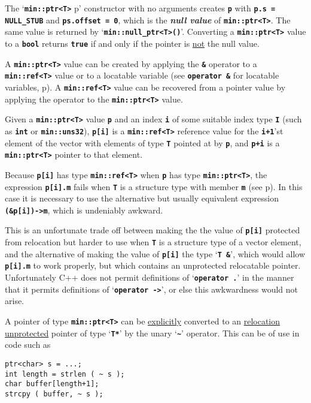 \documentclass[12pt]{article}
\newcommand{\TT}[1]{{\tt \bfseries #1}}
\newcommand{\mkey}[2]{{\bf \em #1}\index{#1!#2}}
\newcommand{\pagref}[1]{p\pageref{#1}}
\newcommand{\EOL}{\penalty \exhyphenpenalty}
\newenvironment{indpar}[1][0.3in]%
	{\begin{list}{}%
		     {\setlength{\itemsep}{0in}%
		      \setlength{\topsep}{0in}%
		      \setlength{\parsep}{1ex}%
		      \setlength{\labelwidth}{#1}%
		      \setlength{\leftmargin}{#1}%
		      \addtolength{\leftmargin}{\labelsep}}%
	 \item}%
	{\end{list}}
\begin{document}
The `\TT{min::\EOL ptr<T>} p' constructor with no arguments creates \TT{p}
with \TT{p.s = NULL\_STUB} and \TT{ps.offset = 0}, which is the
\mkey{null value}{of {\tt ptr<T>}} of \TT{min::\EOL ptr<T>}.
The same value is returned by `\TT{min::\EOL null\_\EOL ptr<T>()}'.
Converting a \TT{min::\EOL ptr<T>} value to a \TT{bool} returns \TT{true}
if and only if the pointer is \underline{not} the null value.

A \TT{min::\EOL ptr<T>} value can be created by applying the
\TT{\&} operator to a \TT{min::\EOL ref<T>} value or to a
locatable variable (see \TT{operator \&} for locatable variables,
\pagref{LOCATABLE_VAR_PTR}).
A \TT{min::\EOL ref<T>} value can be recovered from a
pointer value by applying the
\TT{*} operator to the \TT{min::\EOL ptr<T>} value.

Given a \TT{min::\EOL ptr<T>} value \TT{p} and an index \TT{i} of some
suitable index type \TT{I} (such as \TT{int} or \TT{min::\EOL uns32}),
\TT{p[i]} is a \TT{min::\EOL ref<T>}
reference value for the \TT{i+1}'st element of
the vector with elements of type \TT{T} pointed at by \TT{p}, and
\TT{p+i} is a \TT{min::\EOL ptr<T>} pointer to that element.

Because \TT{p[i]} has type \TT{min::\EOL ref<T>} when \TT{p} has
type \TT{min::\EOL ptr<T>}, the expression \TT{p[i].m} fails when
\TT{T} is a structure type with member \TT{m} (see \pagref{REF->}).
In this case it is
necessary to use the alternative but usually equivalent expression
\TT{(\&p[i])->m}, which is undeniably awkward.

This is an unfortunate trade off between making the
the value of \TT{p[i]} protected from relocation
but harder to use when \TT{T} is a structure type of a vector element,
and the alternative of making the value of \TT{p[i]}
the type `\TT{T \&}', which would allow \TT{p[i].m}
to work properly, but which contains an unprotected relocatable pointer.
Unfortunately C++ does not permit definitions of `\TT{operator .}' in
the manner that it permits definitions of `\TT{operator ->}', or else
this awkwardness would not arise.

A pointer of type \TT{min::ptr<T>} can be \underline{explicitly} converted
to an \underline{relocation unprotected}
pointer of type `\TT{T*}' by the unary `\TT{\textasciitilde}' operator.
This can be of use in code such as
\begin{indpar}\begin{verbatim}
ptr<char> s = ...;
int length = strlen ( ~ s );
char buffer[length+1];
strcpy ( buffer, ~ s );
\end{verbatim}\end{indpar}
\end{document}
